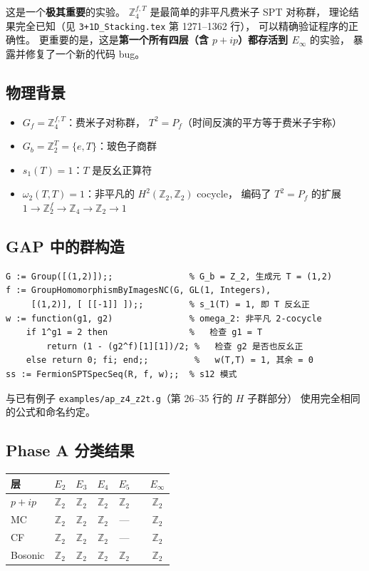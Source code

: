 \documentclass[a4paper,fontset=ubuntu,12pt]{ctexart}
\begin{document}
这是一个\textbf{极其重要}的实验。
$\mathbb{Z}_4^{f,T}$ 是最简单的非平凡费米子 SPT 对称群，
理论结果完全已知（见 \texttt{3+1D\_Stacking.tex} 第 1271--1362 行），
可以精确验证程序的正确性。
更重要的是，这是\textbf{第一个所有四层（含 $p{+}ip$）都存活到 $E_\infty$} 的实验，
暴露并修复了一个新的代码 bug。

\subsection{物理背景}

\begin{itemize}
\item $G_f = \mathbb{Z}_4^{f,T}$：费米子对称群，
      $T^2 = P_f$（时间反演的平方等于费米子宇称）
\item $G_b = \mathbb{Z}_2^T = \{e, T\}$：玻色子商群
\item $s_1(T) = 1$：$T$ 是反幺正算符
\item $\omega_2(T, T) = 1$：非平凡的 $H^2(\mathbb{Z}_2, \mathbb{Z}_2)$ cocycle，
      编码了 $T^2 = P_f$ 的扩展 $1 \to \mathbb{Z}_2^f \to \mathbb{Z}_4 \to \mathbb{Z}_2 \to 1$
\end{itemize}

\subsection{GAP 中的群构造}

\begin{verbatim}
G := Group([(1,2)]);;               % G_b = Z_2, 生成元 T = (1,2)
f := GroupHomomorphismByImagesNC(G, GL(1, Integers),
     [(1,2)], [ [[-1]] ]);;         % s_1(T) = 1, 即 T 反幺正
w := function(g1, g2)               % omega_2: 非平凡 2-cocycle
    if 1^g1 = 2 then                %   检查 g1 = T
        return (1 - (g2^f)[1][1])/2; %   检查 g2 是否也反幺正
    else return 0; fi; end;;         %   w(T,T) = 1, 其余 = 0
ss := FermionSPTSpecSeq(R, f, w);;  % s12 模式
\end{verbatim}

与已有例子 \texttt{examples/ap\_z4\_z2t.g}（第 26--35 行的 $H$ 子群部分）
使用完全相同的公式和命名约定。

\subsection{Phase A 分类结果}

\begin{center}
\begin{tabular}{l|ccccc|c}
\hline
层 & $E_2$ & $E_3$ & $E_4$ & $E_5$ & & $E_\infty$ \\
\hline
$p{+}ip$ & $\mathbb{Z}_2$ & $\mathbb{Z}_2$ & $\mathbb{Z}_2$ & $\mathbb{Z}_2$ & & $\mathbb{Z}_2$ \\
MC & $\mathbb{Z}_2$ & $\mathbb{Z}_2$ & $\mathbb{Z}_2$ & --- & & $\mathbb{Z}_2$ \\
CF & $\mathbb{Z}_2$ & $\mathbb{Z}_2$ & $\mathbb{Z}_2$ & --- & & $\mathbb{Z}_2$ \\
Bosonic & $\mathbb{Z}_2$ & $\mathbb{Z}_2$ & $\mathbb{Z}_2$ & $\mathbb{Z}_2$ & & $\mathbb{Z}_2$ \\
\hline
\end{tabular}
\end{center}
\end{document}
